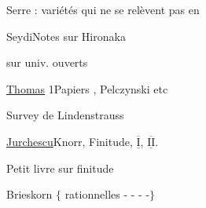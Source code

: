 
Serre : variétés qui ne se relèvent pas en 

Seydi\qquad Notes sur  Hironaka

 sur  univ. ouverts

\uline{Thomas} 1\qquad Papiers , Pelczynski etc

Survey de Lindenstrauss \unsure{---|--}

\uline{Jurchescu}\qquad Knorr, Finitude, $\overline{\underline{\mathrm I}}$, $\overline{\underline{\mathrm {II}}}$.

Petit livre sur finitude

\qquad Brieskorn $\{$ rationnelles - - - -$\}$

\qquad {}

\clearpage
\normalmarginpar
